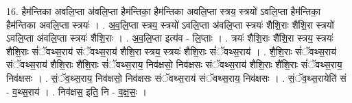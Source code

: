 \documentclass[17pt]{extarticle}
\begin{document}
16. हैम॑न्तिका अवलि॒प्ता अ॑वलि॒प्ता हैम॑न्तिका॒ हैम॑न्तिका अवलि॒प्ता स्त्रय॒ स्त्रयो॑ ऽवलि॒प्ता हैम॑न्तिका॒ हैम॑न्तिका अवलि॒प्ता स्त्रयः॑ । . अ॒व॒लि॒प्ता स्त्रय॒ स्त्रयो॑ ऽवलि॒प्ता अ॑वलि॒प्ता स्त्रयः॑ शैशि॒राः शै॑शि॒रा स्त्रयो॑ ऽवलि॒प्ता अ॑वलि॒प्ता स्त्रयः॑ शैशि॒राः । . अ॒व॒लि॒प्ता इत्य॑व - लि॒प्ताः । . त्रयः॑ शैशि॒राः शै॑शि॒रा स्त्रय॒ स्त्रयः॑ शैशि॒राः सं॑ॅवथ्स॒राय॑ संॅवथ्स॒राय॑ शैशि॒रा स्त्रय॒ स्त्रयः॑ शैशि॒राः सं॑ॅवथ्स॒राय॑ । . शै॒शि॒राः सं॑ॅवथ्स॒राय॑ संॅवथ्स॒राय॑ शैशि॒राः शै॑शि॒राः सं॑ॅवथ्स॒राय॒ निव॑क्षसो॒ निव॑क्षसः संॅवथ्स॒राय॑ शैशि॒राः शै॑शि॒राः सं॑ॅवथ्स॒राय॒ निव॑क्षसः । . सं॒ॅव॒थ्स॒राय॒ निव॑क्षसो॒ निव॑क्षसः संॅवथ्स॒राय॑ संॅवथ्स॒राय॒ निव॑क्षसः । . सं॒ॅव॒थ्स॒रायेति॑ सं - व॒थ्स॒राय॑ । . निव॑क्षस॒ इति॒ नि - व॒क्ष॒सः॒ । \newline
\pagebreak
\end{document}
